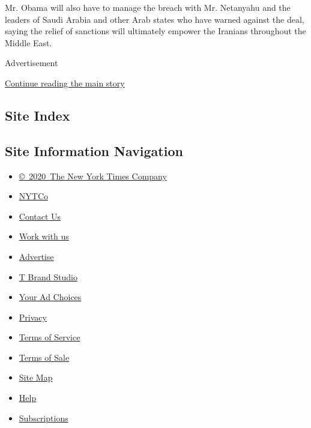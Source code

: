 Mr. Obama will also have to manage the breach with Mr. Netanyahu and the
leaders of Saudi Arabia and other Arab states who have warned against
the deal, saying the relief of sanctions will ultimately empower the
Iranians throughout the Middle East.

Advertisement

\protect\hyperlink{after-bottom}{Continue reading the main story}

\hypertarget{site-index}{%
\subsection{Site Index}\label{site-index}}

\hypertarget{site-information-navigation}{%
\subsection{Site Information
Navigation}\label{site-information-navigation}}

\begin{itemize}
\tightlist
\item
  \href{https://help.nytimes3xbfgragh.onion/hc/en-us/articles/115014792127-Copyright-notice}{©~2020~The
  New York Times Company}
\end{itemize}

\begin{itemize}
\tightlist
\item
  \href{https://www.nytco.com/}{NYTCo}
\item
  \href{https://help.nytimes3xbfgragh.onion/hc/en-us/articles/115015385887-Contact-Us}{Contact
  Us}
\item
  \href{https://www.nytco.com/careers/}{Work with us}
\item
  \href{https://nytmediakit.com/}{Advertise}
\item
  \href{http://www.tbrandstudio.com/}{T Brand Studio}
\item
  \href{https://www.nytimes3xbfgragh.onion/privacy/cookie-policy\#how-do-i-manage-trackers}{Your
  Ad Choices}
\item
  \href{https://www.nytimes3xbfgragh.onion/privacy}{Privacy}
\item
  \href{https://help.nytimes3xbfgragh.onion/hc/en-us/articles/115014893428-Terms-of-service}{Terms
  of Service}
\item
  \href{https://help.nytimes3xbfgragh.onion/hc/en-us/articles/115014893968-Terms-of-sale}{Terms
  of Sale}
\item
  \href{https://spiderbites.nytimes3xbfgragh.onion}{Site Map}
\item
  \href{https://help.nytimes3xbfgragh.onion/hc/en-us}{Help}
\item
  \href{https://www.nytimes3xbfgragh.onion/subscription?campaignId=37WXW}{Subscriptions}
\end{itemize}
